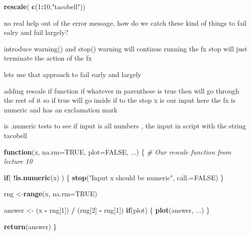 \documentclass[]{article}
\newenvironment{Shaded}{\begin{snugshade}}{\end{snugshade}}
\newcommand{\KeywordTok}[1]{\textcolor[rgb]{0.13,0.29,0.53}{\textbf{#1}}}
\newcommand{\DataTypeTok}[1]{\textcolor[rgb]{0.13,0.29,0.53}{#1}}
\newcommand{\DecValTok}[1]{\textcolor[rgb]{0.00,0.00,0.81}{#1}}
\newcommand{\StringTok}[1]{\textcolor[rgb]{0.31,0.60,0.02}{#1}}
\newcommand{\CommentTok}[1]{\textcolor[rgb]{0.56,0.35,0.01}{\textit{#1}}}
\newcommand{\OtherTok}[1]{\textcolor[rgb]{0.56,0.35,0.01}{#1}}
\newcommand{\ControlFlowTok}[1]{\textcolor[rgb]{0.13,0.29,0.53}{\textbf{#1}}}
\newcommand{\OperatorTok}[1]{\textcolor[rgb]{0.81,0.36,0.00}{\textbf{#1}}}
\newcommand{\NormalTok}[1]{#1}
\begin{document}
\begin{Shaded}
\begin{Highlighting}[]
\KeywordTok{rescale}\NormalTok{( }\KeywordTok{c}\NormalTok{(}\DecValTok{1}\OperatorTok{:}\DecValTok{10}\NormalTok{,}\StringTok{"tacobell"}\NormalTok{))}
\end{Highlighting}
\end{Shaded}

no real help out of the error message, how do we catch these kind of
things to fail ealry and fail largely?

introduce warning() and stop() warning will continue running the fx stop
will just terminate the action of the fx

lets use that approach to fail early and largely

adding rescale if function if whatever in parenthese is true then will
go through the rest of it so if true will go inside if to the stop x is
our input here the fx is numeric and has an exclamation mark

is .numeric tests to see if input is all numbers , the input in script
with the string tacobell

\begin{Shaded}
\begin{Highlighting}[]
\ControlFlowTok{function}\NormalTok{(x, }\DataTypeTok{na.rm=}\OtherTok{TRUE}\NormalTok{, }\DataTypeTok{plot=}\OtherTok{FALSE}\NormalTok{, ...) \{}
  \CommentTok{# Our rescale function from lecture 10}

  \ControlFlowTok{if}\NormalTok{( }\OperatorTok{!}\KeywordTok{is.numeric}\NormalTok{(x) ) \{}
    \KeywordTok{stop}\NormalTok{(}\StringTok{"Input x should be numeric"}\NormalTok{, }\DataTypeTok{call.=}\OtherTok{FALSE}\NormalTok{)}
\NormalTok{  \}}
  
\NormalTok{  rng <-}\KeywordTok{range}\NormalTok{(x, }\DataTypeTok{na.rm=}\OtherTok{TRUE}\NormalTok{)}

\NormalTok{  answer <-}\StringTok{ }\NormalTok{(x }\OperatorTok{-}\StringTok{ }\NormalTok{rng[}\DecValTok{1}\NormalTok{]) }\OperatorTok{/}\StringTok{ }\NormalTok{(rng[}\DecValTok{2}\NormalTok{] }\OperatorTok{-}\StringTok{ }\NormalTok{rng[}\DecValTok{1}\NormalTok{])}
  \ControlFlowTok{if}\NormalTok{(plot) \{ }
    \KeywordTok{plot}\NormalTok{(answer, ...) }
\NormalTok{  \}}

  \KeywordTok{return}\NormalTok{(answer)}
\NormalTok{\}}
\end{Highlighting}
\end{Shaded}
\end{document}
